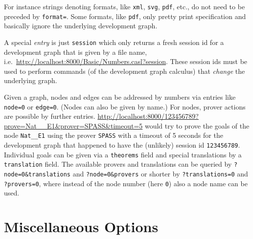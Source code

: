 \documentclass{article}
\begin{document}
For instance strings denoting formats, like \texttt{xml}, \texttt{svg},
\texttt{pdf}, etc., do not need to be preceded by \texttt{format=}.  Some
formats, like \texttt{pdf}, only pretty print specification and
basically ignore the underlying development graph.

A special \emph{entry} is just \texttt{session} which only returns a fresh
session id for a development graph that is given by a file name, i.e.\
\url{http://localhost:8000/Basic/Numbers.casl?session}. These session ids must
be used to perform commands (of the development graph calculus) that
\emph{change} the underlying graph.

Given a graph, nodes and edges can be addressed by numbers via entries like
\texttt{node=0} or \texttt{edge=0}. (Nodes can also be given by name.)  For
nodes, prover actions are possible by further
entries. \url{http://localhost:8000/123456789?prove=Nat\_\_E1\&prover=SPASS\&timeout=5}
would try to prove the goals of the node \texttt{Nat\_\_E1} using the prover
\texttt{SPASS} with a timeout of 5 seconds for the development graph that
happened to have the (unlikely) session id \texttt{123456789}. Individual
goals can be given via a \texttt{theorems} field and special translations by a
\texttt{translation} field. The available provers and translations can be
queried by \texttt{?node=0\&translations} and \texttt{?node=0\&provers} or
shorter by \texttt{?translations=0} and \texttt{?provers=0}, where instead of
the node number (here \texttt{0}) also a node name can be used.

\section{Miscellaneous Options}
\end{document}
